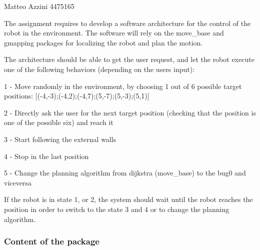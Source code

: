 Matteo Azzini 4475165

The assignment requires to develop a software architecture for the control of the robot in the environment. The software will rely on the move\+\_\+base and gmapping packages for localizing the robot and plan the motion.

The architecture should be able to get the user request, and let the robot execute one of the following behaviors (depending on the user\textquotesingle{}s input)\+: \begin{DoxyVerb}1 - Move randomly in the environment, by choosing 1 out of 6 possible target positions: [(-4,-3);(-4,2);(-4,7);(5,-7);(5,-3);(5,1)]

2 - Directly ask the user for the next target position (checking that the position is one of the possible six) and reach it

3 - Start following the external walls

4 - Stop in the last position

5 - Change the planning algorithm from dijkstra (move_base) to the bug0 and viceversa
\end{DoxyVerb}


If the robot is in state 1, or 2, the system should wait until the robot reaches the position in order to switch to the state 3 and 4 or to change the planning algorithm.

\subsubsection*{Content of the package}


